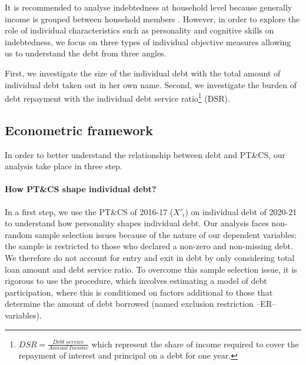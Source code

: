 \documentclass[a4paper, 11pt, onecolumn]{article}
\begin{document}
It is recommended to analyse indebtedness at household level because generally income is grouped between household members \citep{European2010}.
However, in order to explore the role of individual characteristics such as personality and cognitive skills on indebtedness, we focus on three types of individual objective measures allowing us to understand the debt from three angles.

First, we investigate the size of the individual debt with the total amount of individual debt taken out in her own name.
Second, we investigate the burden of debt repayment with the individual debt service ratio\footnote{$DSR=\frac{Debt~service}{Annual~Income}$ which represent the share of income required to cover the repayment of interest and principal on a debt for one year.} (DSR).




	\subsection{Econometric framework}
	\label{subsection:econometricframework}

In order to better understand the relationship between debt and PT\&CS, our analysis take place in three step.
\paragraph{How PT\&CS shape individual debt?}
In a first step, we use the PT\&CS of 2016-17 ($X'_{i}$) on individual debt of 2020-21 to understand how personality shapes individual debt.
Our analysis faces non-random sample selection issues because of the nature of our dependent variables: the sample is restricted to those who declared a non-zero and non-missing debt.
We therefore do not account for entry and exit in debt by only considering total loan amount and debt service ratio.
To overcome this sample selection issue, it is rigorous to use the \cite{Heckman1976} procedure, which involves estimating a model of debt participation, where this is conditioned on factors additional to those that determine the amount of debt
borrowed (named exclusion restriction --ER-- variables).
\end{document}
